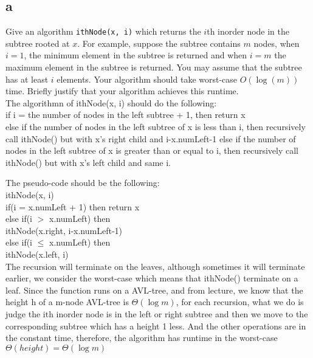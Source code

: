 \documentclass[12pt]{article}
\begin{document}
	\begin{enumerate}
		
		\part{a} Give an algorithm {\tt ithNode(x, i)} which returns the $i$th inorder node in the subtree rooted at $x$.
		For example, suppose the subtree contains $m$ nodes, when $i=1$, the minimum element in the subtree is returned and when $i=m$ the maximum element in the subtree is returned.
		You may assume that the subtree has at least $i$ elements.
		Your algorithm should take worst-case $O(\log(m))$ time.
		Briefly justify that your algorithm achieves this runtime.\\
		
		The algorithmn of ithNode(x, i) should do the following:\\
		if i = the number of nodes in the left subtree + 1, then return x\\
		else if the number of nodes in the left subtree of x is less than i, then recursively call ithNode() but with x's right child and i-x.numLeft-1
		else if the number of nodes in the left subtree of x is greater than or equal to i, then recursively call ithNode() but with x's left child and same i.
		
		The pseudo-code should be the following:\\
		ithNode(x, i)\\
		\hphantom{1111}if(i = x.numLeft + 1) then return x\\
		\hphantom{1111}else if(i $>$ x.numLeft) then\\
		\hphantom{11111111} ithNode(x.right, i-x.numLeft-1)\\
		\hphantom{1111}else if(i $\leq$ x.numLeft) then\\
		\hphantom{11111111} ithNode(x.left, i)\\
		
		The recursion will terminate on the leaves, although sometimes it will terminate earlier, we consider the worst-case which means that ithNode() terminate on a leaf. Since the function runs on a AVL-tree, and from lecture, we know that the height h of a m-node AVL-tree is $\Theta(\log m)$, for each recursion, what we do is judge the ith inorder node is in the left or right subtree and then we move to the corresponding subtree which has a height 1 less. And the other operations are in the constant time, therefore, the algorithm has runtime in the worst-case $\Theta(height) = \Theta(\log m)$\\
		

\end{enumerate}
\end{document}
